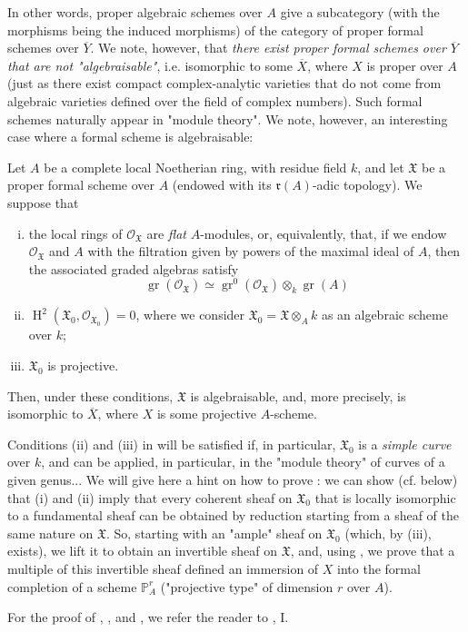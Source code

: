 In other words, proper algebraic schemes over $A$ give a subcategory (with the morphisms being the induced morphisms) of the category of proper formal schemes over $\overline{Y}$.
We note, however, that \emph{there exist proper formal schemes over $\overline{Y}$ that are not "algebraisable"}, i.e. isomorphic to some $\overline{X}$, where $X$ is proper over $A$ (just as there exist compact complex-analytic varieties that do not come from algebraic varieties defined over the field of complex numbers).
Such formal schemes naturally appear in "module theory".
We note, however, an interesting case where a formal scheme is algebraisable:

\begin{theorem}\label{fga2-theorem-4}
    Let $A$ be a complete local Noetherian ring, with residue field $k$, and let $\mathfrak{X}$ be a proper formal scheme over $A$ (endowed with its $\mathfrak{r}(A)$-adic topology).
    We suppose that
    \begin{enumerate}[i.]
        \item the local rings of $\mathcal{O}_{\mathfrak{X}}$ are \emph{flat} $A$-modules, or, equivalently, that, if we endow $\mathcal{O}_{\mathfrak{X}}$ and $A$ with the filtration given by powers of the maximal ideal of $A$, then the associated graded algebras satisfy
              \[\operatorname{gr}(\mathcal{O}_{\mathfrak{X}}) \simeq \operatorname{gr}^0(\mathcal{O}_{\mathfrak{X}})\otimes_k\operatorname{gr}(A)\]
        \item $\operatorname{H}^2(\mathfrak{X}_0,\mathcal{O}_{\mathfrak{X}_0})=0$, where we consider $\mathfrak{X}_0=\mathfrak{X}\otimes_Ak$ as an algebraic scheme over $k$;
        \item $\mathfrak{X}_0$ is projective.
    \end{enumerate}
    Then, under these conditions, $\mathfrak{X}$ is algebraisable, and, more precisely, is isomorphic to $\overline{X}$, where $X$ is some projective $A$-scheme.
\end{theorem}


Conditions (ii) and (iii) in  will be satisfied if, in particular, $\mathfrak{X}_0$ is a \emph{simple curve} over $k$, and  can be applied, in particular, in the "module theory" of curves of a given genus...
We will give here a hint on how to prove :
we can show (cf.  below) that (i) and (ii) imply that every coherent sheaf on $\mathfrak{X}_0$ that is locally isomorphic to a fundamental sheaf can be obtained by reduction starting from a sheaf of the same nature on $\mathfrak{X}$.
So, starting with an "ample" sheaf on $\mathfrak{X}_0$ (which, by (iii), exists), we lift it to obtain an invertible sheaf on $\mathfrak{X}$, and, using , we prove that a multiple of this invertible sheaf defined an immersion of $X$ into the formal completion of a scheme $\mathbb{P}_A^r$ ("projective type" of dimension $r$ over $A$).

For the proof of , , and , we refer the reader to \cite{GD1960}, I.
